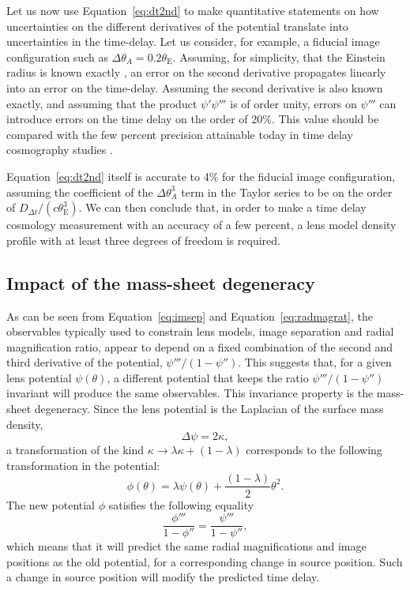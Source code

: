 \documentclass[usenatbib]{mnras}
\def\psii{\psi'}
\def\psiii{\psi''}
\def\psiiii{\psi'''}
\def\tein{\theta_{\mathrm{E}}}
\def\Eref#1{Equation~\ref{#1}\xspace}
\begin{document}
Let us now use \Eref{eq:dt2nd} to make quantitative statements on how uncertainties on the different derivatives of the potential translate into uncertainties in the time-delay.
Let us consider, for example, a fiducial image configuration such as $\Delta\theta_A = 0.2\tein$.
Assuming, for simplicity, that the Einstein radius is known exactly {\bf \citep[this is a good approximation, since $\tein$ is typically determined with better than 1\% precision in time-delay lens studies][]{Suy++14, Won++17}}, an error on the second derivative propagates linearly into an error on the time-delay. Assuming the second derivative is also known exactly, and assuming that the product $\psii\psiiii$ is of order unity, errors on $\psiiii$ can introduce errors on the time delay on the order of 20\%.
This value should be compared with the few percent precision attainable today in time delay cosmography studies \citep{Suy++17}.

\Eref{eq:dt2nd} itself is accurate to 4\% for the fiducial image configuration, assuming the coefficient of the $\Delta\theta_A^3$ term in the Taylor series to be on the order of $D_{\Delta t}/(c\tein^3)$.
We can then conclude that, in order to make a time delay cosmology measurement with an accuracy of a few percent, a lens model density profile with at least three degrees of freedom is required.

\subsection{{\bf Impact of the} mass-sheet degeneracy}\label{ssec:msd}

As can be seen from \Eref{eq:imsep} and \Eref{eq:radmagrat}, 
the observables typically used to constrain lens models, image separation and radial magnification ratio, appear to depend on a fixed combination of the second and third derivative of the potential, $\psiiii/(1-\psiii)$.
This suggests that, for a given lens potential $\psi(\theta)$, a different potential that keeps the ratio $\psiiii/(1-\psiii)$ invariant will produce the same observables.
This invariance property is the mass-sheet degeneracy. Since the lens potential is the Laplacian of the surface mass density,
\begin{equation}
\Delta\psi = 2\kappa,
\end{equation}
a transformation of the kind $\kappa \rightarrow \lambda\kappa + (1-\lambda)$ corresponds to the following transformation in the potential:
\begin{equation}\label{eq:pottransform}
\phi(\theta) = \lambda\psi(\theta) + \frac{(1-\lambda)}{2}\theta^2.
\end{equation}
The new potential $\phi$ satisfies the following equality
\begin{equation}\label{eq:mymst}
\frac{\phi'''}{1-\phi''} = \frac{\psiiii}{1-\psiii},
\end{equation}
which means that it will predict the same radial magnifications and image positions as the old potential, for a corresponding change in source position. Such a change in source position will modify the predicted time delay.
\end{document}
